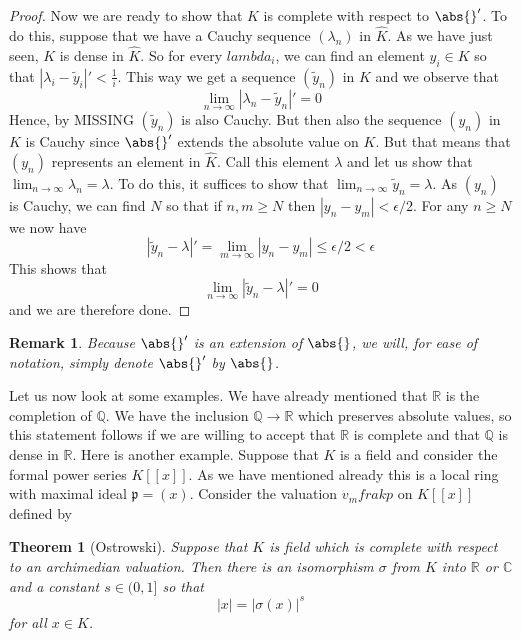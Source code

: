 \documentclass{article}
\newtheorem{theorem}{Theorem}[section]
\newtheorem{remark}{Remark}[section]
\newcommand{\mfrak}[1]{\mathfrak{#1}}
\newcommand{\mbb}[1]{\mathbb{#1}}
\begin{document}
\begin{proof}
    Now we are ready to show that $\hat K$ is complete with respect to $\abs{}'$. To do this, suppose that we have a Cauchy sequence $(\lambda_n)$ in $\hat K$. As we have just seen, $K$ is dense in $\hat K$. So for every $lambda_i$, we can find an element $y_i \in K$ so that $|\lambda_i - \tilde y_i|' < \frac{1}{i}$. This way we get a sequence $(\tilde y_n)$ in $\hat K$ and we observe that
    $$\lim_{n \to \infty} |\lambda_n - \tilde y_n|' = 0$$
    Hence, by MISSING $(\tilde y_n)$ is also Cauchy. But then also the sequence $(y_n)$ in $K$ is Cauchy since $\abs{}'
    $ extends the absolute value on $K$. But that means that $(y_n)$ represents an element in $\hat K$. Call this element $\lambda$ and let us show that $\lim_{n \to \infty} \lambda_n = \lambda$. To do this, it suffices to show that $\lim_{n \to \infty} \tilde y_n = \lambda$. As $(y_n)$ is Cauchy, we can find $N$ so that if $n,m \geq N$ then $|y_n - y_m| < \epsilon / 2$. For any $n \geq N$ we now have
    $$|\tilde y_n - \lambda|' = \lim_{m \to \infty} |y_n - y_m| \leq \epsilon / 2 < \epsilon$$
    This shows that
    $$\lim_{n \to \infty} |\tilde y_n - \lambda|' = 0$$
    and we are therefore done.
\end{proof}
\begin{remark}
    Because $\abs{}'$ is an extension of $\abs{}$, we will, for ease of notation, simply denote $\abs{}'$ by $\abs{}$.
\end{remark}

Let us now look at some examples. We have already mentioned that $\mbb R$ is the completion of $\mbb Q$. We have the inclusion $\mbb Q \rightarrow \mbb R$ which preserves absolute values, so this statement follows if we are willing to accept that $\mbb R$ is complete and that $\mbb Q$ is dense in $\mbb R$. Here is another example. Suppose that $K$ is a field and consider the formal power series $K[[x]]$. As we have mentioned already this is a local ring with maximal ideal $\mfrak p = (x)$. Consider the valuation $v_mfrak{p}$ on $K[[x]]$ defined by

\begin{theorem}[Ostrowski]
    Suppose that $K$ is field which is complete with respect to an archimedian valuation. Then there is an isomorphism $\sigma$ from $K$ into $\mbb R$ or $\mbb C$ and a constant $s \in (0,1]$ so that
    $$|x| = |\sigma(x)|^s$$
    for all $x \in K$.
\end{theorem}

\end{document}
